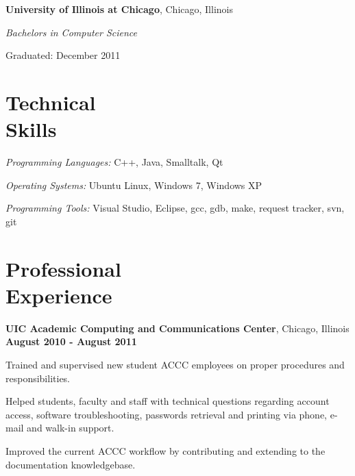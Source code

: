 \documentclass[margin,line]{resume}
\begin{document}
\begin{resume}
    {\bf University of Illinois at Chicago}, Chicago, Illinois\vspace{2mm}%
    \begin{list1}
    \item[] {\sl Bachelors in Computer Science}
    \begin{list2}
        \item Graduated:  December 2011
    \end{list2}
    \end{list1}




	\vspace{2mm}

  \section{\mysidestyle Technical\\Skills}
    \begin{list2}
		\item {\sl Programming Languages:}  C++, Java, Smalltalk, Qt
		\item {\sl Operating Systems:}  Ubuntu Linux, Windows 7, Windows XP
        \item {\sl Programming Tools:} Visual Studio, Eclipse, gcc, gdb, make, request tracker, svn, git
    \end{list2}

    \section{\mysidestyle Professional\\Experience}
	\vspace{2mm}



    {\bf UIC Academic Computing and Communications Center}, Chicago, Illinois\\
    \vspace{1mm}{\sl Computer Consultant } \hfill {\bf August 2010 - August 2011}
    \begin{list2}
        \item Trained and supervised new student ACCC employees on proper procedures and responsibilities.
        \item Helped students, faculty and staff with technical questions regarding account access, software troubleshooting, passwords retrieval and printing via phone, e-mail  and walk-in support.
        \item Improved the current ACCC workflow by contributing and extending to the documentation knowledgebase.  
    \end{list2}


\end{resume}
\end{document}
